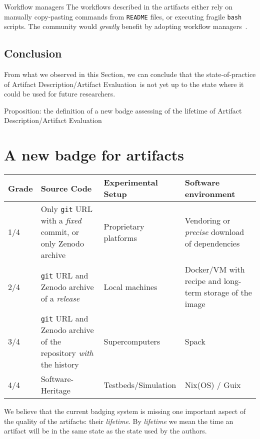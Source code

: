 \documentclass[sigconf,natbib=false]{acmart}
\newcommand{\ad}{Artifact Description}
\newcommand{\aeval}{Artifact Evaluation}
\newcommand{\adae}{\ad/\aeval}
\begin{document}
\begin{lesson}{Workflow managers}{}
  The workflows described in the artifacts either rely on manually copy-pasting commands from \texttt{README} files, or executing fragile \texttt{bash} scripts.
  The community would \emph{greatly} benefit by adopting workflow managers\ \cite{wratten2021reproducible}.
\end{lesson}

\subsection{Conclusion}\label{sec:sop:conclu}

From what we observed in this Section, we can conclude that the state-of-practice of \adae\ is not yet up to the state where it could be used for future researchers.

Proposition: the definition of a new badge assessing of the lifetime of \adae


%
\section{A new badge for artifacts}

\begin{table*}
  \caption{\label{tab:lifetime}Grading framework for evaluating the \emph{lifetime} of an artifact.}
  \centering
  \begin{tabular}[t]{l p{18em} p{9em} p{22em}}
  \toprule
    Grade & Source Code &  Experimental Setup & Software environment \\
  \midrule
    1/4 & Only \texttt{git} URL with a \emph{fixed} commit, or only Zenodo archive & Proprietary platforms & Vendoring or \emph{precise} download of dependencies \\
    2/4 & \texttt{git} URL and Zenodo archive of a \emph{release} & Local machines & Docker/VM with recipe and long-term storage of the image \\
    3/4 & \texttt{git} URL and Zenodo archive of the repository \emph{with} the history & Supercomputers & Spack \\
    4/4 & Software-Heritage & Testbeds/Simulation  & Nix(OS) / Guix \\
  \bottomrule
  \end{tabular}
\end{table*}

We believe that the current badging system is missing one important aspect of the quality of the artifacts: their \emph{lifetime}.
By \emph{lifetime} we mean the time an artifact will be in the same state as the state used by the authors.
\end{document}
